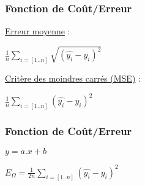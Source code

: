 \begin{frame}
  \frametitle{Fonction de Coût/Erreur}
  \begin{minipage}[l]{0.40\linewidth}
  \underline{Erreur moyenne} :
  \begin{center}
    $\frac{1}{n}\sum_{i=[1..n]}\sqrt{( \hat{y_i} - y_i )^2}$
    \newline
  \end{center}
  \underline{Critère des moindres carrés (MSE)} :
  \begin{center}
    $\frac{1}{n}\sum_{i=[1..n]}( \hat{y_i} - y_i )^2$
  \end{center}
  \end{minipage}\hfill
  \begin{minipage}[l]{0.59\linewidth}
  \end{minipage}\hfill
\end{frame}

\begin{frame}
  \frametitle{Fonction de Coût/Erreur}
  \begin{minipage}[l]{0.49\linewidth}
  \begin{center}
    $y = a.x+b$
  \end{center}
  \end{minipage}\hfill
  \begin{minipage}[l]{0.49\linewidth}
    $\boxed{E_\Omega = \frac{1}{2n}\sum_{i=[1..n]}( \hat{y_i} - y_i )^2}$ \\
  \end{minipage}\hfill
\end{frame}
